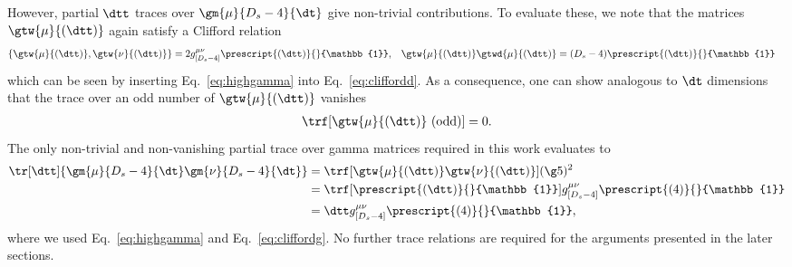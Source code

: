 However, partial $\dtt$ traces over
$\gm{\mu}{D_s-4}{\dt}$ give non-trivial contributions. To evaluate
these, we note that the matrices $\gtw{\mu}{(\dtt)}$ again satisfy a Clifford relation
\begin{align}\label{eq:cliffordg}
\left\{\gtw{\mu}{(\dtt)},\gtw{\nu}{(\dtt)} \right\}
&=2g^{\mu\nu}_{[D_s-4]}\prescript{(\dtt)}{}{\mathbb{1}}, &
\gtw{\mu}{(\dtt)}\gtwd{\mu}{(\dtt)}& =  (D_s-4)\prescript{(\dtt)}{}{\mathbb{1}}
\end{align}
which can be seen by inserting Eq.~\eqref{eq:highgamma} into
Eq.~\eqref{eq:cliffordd}. As a consequence, one can show analogous to $\dt$ dimensions that the trace
over an odd number of $\gtw{\mu}{(\dtt)}$ vanishes 
\begin{align}\label{eq:tracehddodd}
    \trf[\gtw{\mu}{(\dtt)} \text{ (odd)}]=0.
\end{align}
The only non-trivial and non-vanishing partial trace over gamma matrices required in this work evaluates to
\begin{align}
\label{eq:nontrivtrace}
  \begin{split}
  \tr[\dtt]{\gm{\mu}{D_s-4}{\dt} \gm{\nu}{D_s-4}{\dt}} &=
  \trf[{\gtw{\mu}{(\dtt)} \gtw{\nu}{(\dtt)}}] (\g5)^2 \\
&= \trf[{\prescript{(\dtt)}{}{\mathbb{1}}}] g^{\mu\nu}_{[D_s-4]}
\prescript{(4)}{}{\mathbb{1}}\\
&= \dtt g^{\mu\nu}_{[D_s-4]}
\prescript{(4)}{}{\mathbb{1}},
\end{split}
\end{align}
where we used Eq.~\eqref{eq:highgamma} and
Eq.~\eqref{eq:cliffordg}. No further trace relations are required for
the arguments presented in the later sections.




